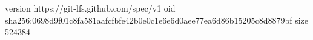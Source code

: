 version https://git-lfs.github.com/spec/v1
oid sha256:0698d9f01c8fa581aafcfbfe42b0e0c1e6e6d0aee77ea6d86b15205c8d8879bf
size 524384
